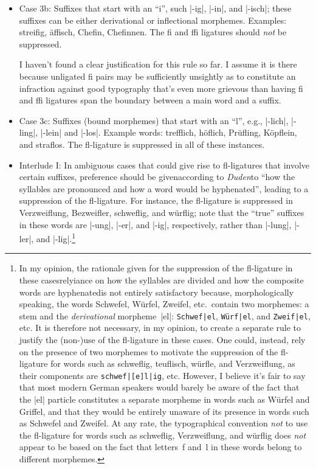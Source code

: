 \documentclass[11pt]{article}
\begin{document}
\begin{itemize}
\begin{itemize}
\item Case 3b: Suffixes that start with an \enquote{i}, such |-ig|, |-in|, and |-isch|; these suffixes can be either derivational or inflectional morphemes. Examples: streifig, äffisch, Chefin, Chefinnen. The fi and ffi ligatures should \emph{not} be suppressed. 

I haven't found a clear justification for this rule so far. I assume it is there because unligated f\breaklig i pairs may be sufficiently unsightly as to constitute an infraction against good typography that's even more grievous than having fi and ffi ligatures span the boundary between a main word and a suffix.


\item Case 3c: Suffixes (bound morphemes) that start with an \enquote{l}, e.g., |-lich|, |-ling|, |-lein| and |-los|. Example words: trefflich, höflich, Prüfling, Köpflein, and s\breaklig traflos. The fl-ligature is suppressed in all of these instances. 

\item Interlude I: In ambiguous cases that could give rise to fl-ligatures that involve certain suffixes, preference should be given\textemdash according to  \emph{Duden}\textemdash to \enquote{how the syllables are pronounced and how a word would be hyphenated}, leading to a suppression of the fl-ligature. For instance, the fl-ligature is suppressed in Verzweif\-lung, Bezweifler, schweflig, and würflig; note that the \enquote{true} suffixes in these words are |-ung|, |-er|, and |-ig|, respectively, rather than |-lung|, |-ler|, and |-lig|.\footnote{%
In my opinion, the rationale given for the suppression of the fl-ligature in these cases\textemdash relyiance on how the syllables are divided and how the composite words are hyphenated\textemdash is not entirely satisfactory because, morphologically speaking, the words Schwefel, Würfel, Zweifel, etc.\ contain two morphemes: a stem and the \emph{derivational} morpheme~|el|: \Verb+Schwef|el+, \Verb+Würf|el+, and \Verb+Zweif|el+, etc. It is therefore not necessary, in my opinion, to create a separate rule to justify the (non-)use of the fl-ligature in these cases. One could, instead, rely on the presence of two morphemes to motivate the suppression of the fl-ligature for words such as schweflig, teuflisch, würfle, and Verzweiflung, as their components are \Verb+schwef|[e]l|ig+, etc. However, I believe it's fair to say that most modern German speakers would barely be aware of the fact that the |el| particle constitutes a separate morpheme in words such as Würfel and Griffel, and that they would be entirely unaware of its presence in words such as Schwefel and Zweifel. At any rate, the typographical convention \emph{not} to use the fl-ligature for words such as schweflig, Verzweiflung, and würflig does \emph{not} appear to be based on the fact that letters~f and~l in these words belong to different morphemes.}


\end{itemize}
\end{itemize}
\end{document}
